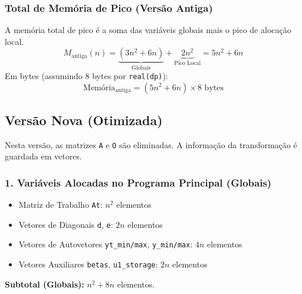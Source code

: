 \documentclass[12pt, a4paper]{article} %
\begin{document}
            \subsubsection*{Total de Mem\'oria de Pico (Vers\~ao Antiga)}
            A mem\'oria total de pico \'e a soma das vari\'aveis globais mais o pico de aloca\c{c}\~ao local.
            \[
            M_{\text{antiga}}(n) = \underbrace{(3n^2 + 6n)}_{\text{Globais}} + \underbrace{2n^2}_{\text{Pico Local}} = 5n^2 + 6n
            \]
            Em bytes (assumindo 8 bytes por \texttt{real(dp)}):
            \[
            \text{Mem\'oria}_{\text{antiga}} = (5n^2 + 6n) \times 8 \text{ bytes}
            \]

            \subsection*{Vers\~ao Nova (Otimizada)}

            Nesta vers\~ao, as matrizes \texttt{A} e \texttt{O} s\~ao eliminadas. A informa\c{c}\~ao da transforma\c{c}\~ao \'e guardada em vetores.

            \subsubsection*{1. Vari\'aveis Alocadas no Programa Principal (Globais)}
            \begin{itemize}
                \item Matriz de Trabalho \texttt{At}: $n^2$ elementos
                \item Vetores de Diagonais \texttt{d}, \texttt{e}: $2n$ elementos
                \item Vetores de Autovetores \texttt{yt\_min/max}, \texttt{y\_min/max}: $4n$ elementos
                \item Vetores Auxiliares \texttt{betas}, \texttt{u1\_storage}: $2n$ elementos
            \end{itemize}
            \textbf{Subtotal (Globais):} $n^2 + 8n$ elementos.
\end{document}
